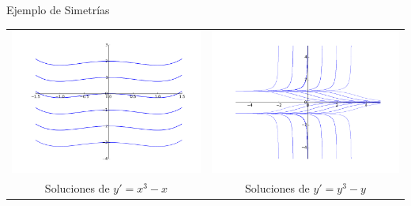 \documentclass[handout,hyperref={colorlinks=true}]{beamer}
\begin{document}
\begin{frame}{Ejemplo de Simetrías}

\begin{tabular}{cc}
\includegraphics[scale=.3]{imagenes/sol_paralelas.png} &\hspace{-1.5cm}\includegraphics[scale=.3]{imagenes/sol_paralelas2.png} \\
Soluciones de $y'=x^3-x$ &\hspace{-1.5cm}Soluciones de $y'=y^3-y$
\end{tabular}

\end{frame}
\end{document}
